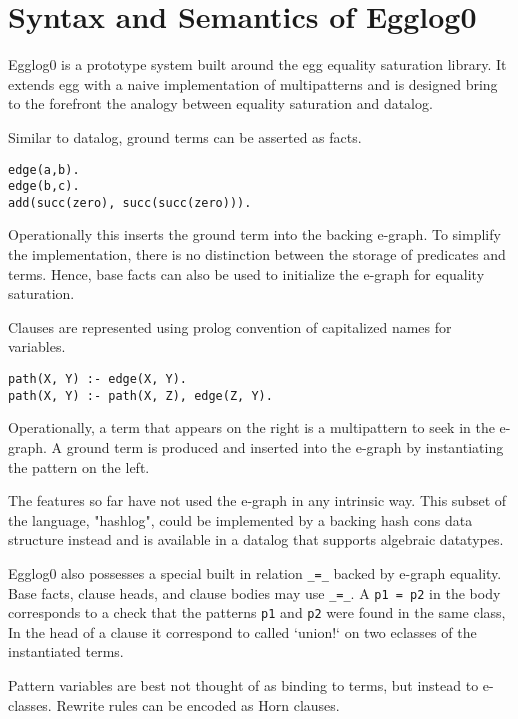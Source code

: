 \documentclass[sigplan,10pt,review,anonymous]{acmart}
\begin{document}
\section{Syntax and Semantics of Egglog0}

Egglog0 is a prototype system built around the egg equality saturation library. It extends egg with a naive implementation of multipatterns and is designed bring to the forefront the analogy between equality saturation and datalog.

Similar to datalog, ground terms can be asserted as facts.

\begin{lstlisting}
edge(a,b).
edge(b,c).
add(succ(zero), succ(succ(zero))).
\end{lstlisting}

Operationally this inserts the ground term into the backing e-graph. To simplify the implementation, there is no distinction between the storage of predicates and terms. Hence, base facts can also be used to initialize the e-graph for equality saturation.

Clauses are represented using prolog convention of capitalized names for variables.

\begin{lstlisting}
path(X, Y) :- edge(X, Y).
path(X, Y) :- path(X, Z), edge(Z, Y).
\end{lstlisting}

Operationally, a term that appears on the right is a multipattern to seek in the e-graph. A ground term is produced and inserted into the e-graph by instantiating the pattern on the left.

The features so far have not used the e-graph in any intrinsic way. This subset of the language, "hashlog", could be implemented by a backing hash cons data structure instead and is available in a datalog that supports algebraic datatypes.

Egglog0 also possesses a special built in relation \lstinline{_=_} backed by e-graph equality. Base facts, clause heads, and clause bodies may use \lstinline{_=_}. A \lstinline{p1 = p2} in the body corresponds to a check that the patterns \lstinline{p1} and \lstinline{p2} were found in the same class,
In the head of a clause it correspond to called `union!` on two eclasses of the instantiated terms.

Pattern variables are best not thought of as binding to terms, but instead to e-classes. Rewrite rules can be encoded as Horn clauses.
\end{document}
